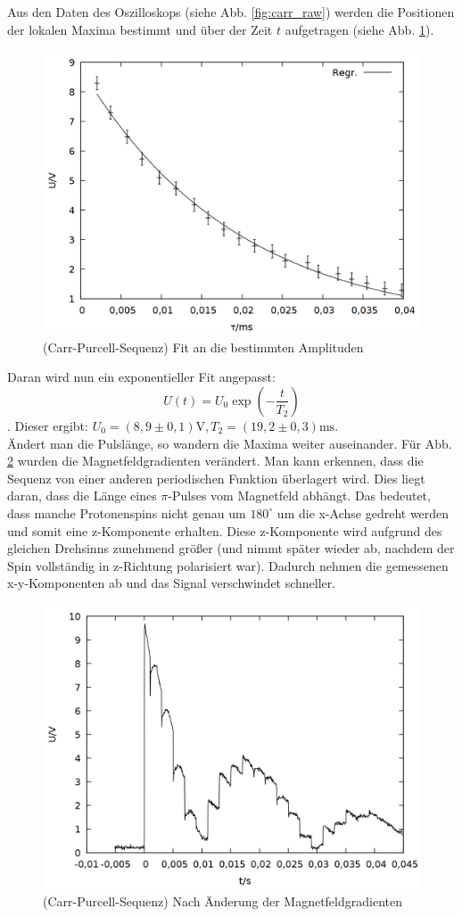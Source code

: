 Aus den Daten des Oszilloskops (siehe Abb. \ref{fig:carr_raw}) werden die Positionen der lokalen Maxima bestimmt und über der Zeit $t$ aufgetragen (siehe Abb. \ref{fig:carr}).
\begin{figure}[h]
\centering
\includegraphics[width=0.75\linewidth]{data/p402_443_data/carr_purcell_sequenz/out_carr.png}
\caption{(Carr-Purcell-Sequenz) Fit an die bestimmten Amplituden}
\label{fig:carr}
\end{figure}

Daran wird nun ein exponentieller Fit angepasst: $$U(t) = U_0\exp{\left(-\frac{t}{T_2}\right)}$$. Dieser ergibt: $U_0 = (8,9\pm 0,1)\si{\volt}, T_2 = (19,2\pm 0,3) \si{\milli\second}$.\\

Ändert man die Pulslänge, so wandern die Maxima weiter auseinander. Für Abb. \ref{fig:carr_b} wurden die Magnetfeldgradienten verändert. Man kann erkennen, dass die Sequenz von einer anderen periodischen Funktion überlagert wird. Dies liegt daran, dass die Länge eines $\pi$-Pulses vom Magnetfeld abhängt. Das bedeutet, dass manche Protonenspins nicht genau um $180^\circ$ um die x-Achse gedreht werden und somit eine z-Komponente erhalten. Diese z-Komponente wird aufgrund des gleichen Drehsinns zunehmend größer (und nimmt später wieder ab, nachdem der Spin vollständig in z-Richtung polarisiert war). Dadurch nehmen die gemessenen x-y-Komponenten ab und das Signal verschwindet schneller.
 
\begin{figure}[h]
\centering
\includegraphics[width=0.75\linewidth]{data/p402_443_data/carr_purcell_sequenz/plot_157.png}
\caption{(Carr-Purcell-Sequenz) Nach Änderung der Magnetfeldgradienten}
\label{fig:carr_b}
\end{figure}

